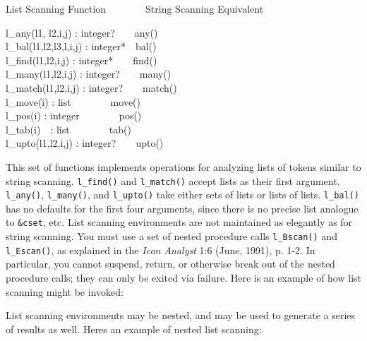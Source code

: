 List Scanning Function\ \ \ \ \ \ \ \ String Scanning Equivalent

l\_any(l1, l2,i,j) : integer?\ \ \ \ any()\\
l\_bal(l1,l2,l3,l,i,j) : integer*\ \ bal()\\
l\_find(l1,l2,i,j) : integer*\ \ \ \ find()\\
l\_many(l1,l2,i,j) : integer?\ \ \ \ many()\\
l\_match(l1,l2,i,j) : integer?\ \ \ \ match()\\
l\_move(i) : list\ \ \ \ \ \ \ \ move()\\
l\_pos(i) : integer\ \ \ \ \ \ \ \ pos()\\
l\_tab(i)\ \ : list\ \ \ \ \ \ \ \ tab()\\
l\_upto(l1,l2,i,j) : integer?\ \ \ \ upto()

This set of functions implements operations for analyzing lists of
tokens similar to string scanning. \texttt{l\_find()} and
\texttt{l\_match()} accept lists as their first argument.
\texttt{l\_any()}, \texttt{l\_many()}, and \texttt{l\_upto()} take
either sets of lists or lists of lists. \texttt{l\_bal()} has no
defaults for the first four arguments, since there is no precise list
analogue to \texttt{\&cset}, etc. List scanning environments are not
maintained as elegantly as for string scanning. You must use a set of
nested procedure calls \texttt{l\_Bscan()} and \texttt{l\_Escan()}, as
explained in the \textit{Icon Analyst} 1:6 (June, 1991), p. 1-2. In
particular, you cannot suspend, return, or otherwise break out of the
nested procedure calls; they can only be exited via failure. Here is an
example of how list scanning might be invoked:


List scanning environments may be nested, and may be used to generate a
series of results as well. Here{\textquotesingle}s an example of nested
list scanning:

